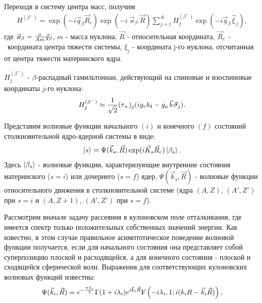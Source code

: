 \documentclass[14pt, a4paper]{article}
\numberwithin{figure}{section}
\numberwithin{equation}{section}
\begin{document}
Переходя в систему центра масс, получим
\begin{eqnarray}\label{H^beta}
H^{(\beta^-)}=\exp{(-i\vec q_\beta\vec R_c)}\exp{( -i \vec \varkappa_\beta \vec R)}
\sum_{j=1}^A H^{(\beta^-)}_{j}\exp{(-i\vec q_\beta\vec\xi_{j})},
\end{eqnarray}
где  $\vec \varkappa_\beta=
{\mu\over Am}\vec q_\beta$, $m$ - масса нуклона,
$\vec R$ - относительная координата, $\vec R_c$~-~координата
центра тяжести системы,
$\xi_j$  - координата j-го нуклона, отсчитанная от центра тяжести материнского
ядра.

$H^{(\beta^-)}_{j}$ - $\beta$-распадный гамильтониан, действующий
на спиновые и изоспиновые координаты $j$-го нуклона:
\begin{eqnarray}
H^{(\beta^-)}_{j}\approx {1\over{\sqrt 2}}(\tau_+)_j ( i g_v b_4 - g_a\, \vec b\, \vec \sigma_j ).\nonumber
\end{eqnarray}


Представим волновые функции начального $(i)$ и конечного $(f)$ состояний
столкновительной ядро-ядерной системы в виде:
\begin{eqnarray}
\ket{s}= \Psi(\vec k_s, \vec R)\exp(i \vec K_s \vec R_c) \ket{ \beta_s}.
\end{eqnarray}
Здесь
$\ket{ \beta_s}$ - волновые функции, характеризующие внутренние состояния
материнского ($s=i$) или дочернего ($s=f$) ядер,
$\Psi (\vec k_s, \vec R)$ - волновые функции относительного движения в
столкновительной системе (ядра $(A,Z)$, $(A',Z')$ при $s=i$
и $(A,Z+1)$, $(A',Z')$ при $s=f$).

Рассмотрим вначале задачу рассеяния в кулоновском поле отталкивания, где имеется  спектр только положительных собственных
значений энергии. Как известно, в этом случае правильное асимптотическое поведение волновой функции
получается, если для начального состояния она представляет собой суперпозицию плоской и расходящейся, а для конечного
состояния - плоской и сходящейся сферической волн. Выражения для соответствующих кулоновских волновых функций известны:
\begin{eqnarray}\label{psi_i}
\Psi (\vec k_i, \vec R)=e^{-{\pi \lambda_i\over2}} \Gamma(1+i\lambda_i)
e^{i \vec k_i \vec R} {\rm F} \left(- i \lambda_i,1;i(k_i R - \vec k_i \vec R)\right),
\end{eqnarray}
\end{document}
